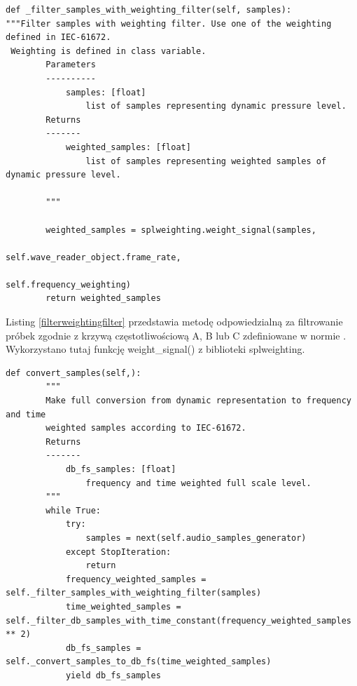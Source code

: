 \documentclass[eng,printmode]{mgr}
\begin{document}
\begin{minipage}{\linewidth}
\begin{lstlisting}[caption={fragment kodu źródłowego pliku SampledBConverter.py, klasa SamplesDbFSConverter, metoda \_filter\_samples\_with\_weighting\_filter},captionpos=b,label={filterweightingfilter}]
   def _filter_samples_with_weighting_filter(self, samples):
"""Filter samples with weighting filter. Use one of the weighting defined in IEC-61672.
 Weighting is defined in class variable.
        Parameters
        ----------
            samples: [float]
                list of samples representing dynamic pressure level.
        Returns
        -------
            weighted_samples: [float]
                list of samples representing weighted samples of dynamic pressure level.

        """

        weighted_samples = splweighting.weight_signal(samples,
                                                      self.wave_reader_object.frame_rate,
                                                      self.frequency_weighting)
        return weighted_samples
\end{lstlisting}
\end{minipage}


Listing \ref{filterweightingfilter} przedstawia metodę odpowiedzialną za filtrowanie próbek zgodnie z krzywą częstotliwościową A, B lub C zdefiniowane w normie \cite{IEC-61672-2013}. Wykorzystano tutaj funkcję weight\_signal() z biblioteki splweighting.\cite{splweighting}

\begin{minipage}{\linewidth}
\begin{lstlisting}[caption={fragment kodu źródłowego pliku SampledBConverter.py, klasa SamplesDbSPLConverter, metoda convert\_samples},captionpos=b,label={convertsamples}]
    def convert_samples(self,):
        """
        Make full conversion from dynamic representation to frequency and time
        weighted samples according to IEC-61672.
        Returns
        -------
            db_fs_samples: [float]
                frequency and time weighted full scale level.
        """
        while True:
            try:
                samples = next(self.audio_samples_generator)
            except StopIteration:
                return
            frequency_weighted_samples = self._filter_samples_with_weighting_filter(samples)
            time_weighted_samples = self._filter_db_samples_with_time_constant(frequency_weighted_samples ** 2)
            db_fs_samples = self._convert_samples_to_db_fs(time_weighted_samples)
            yield db_fs_samples
\end{lstlisting}
\end{minipage}
\end{document}
